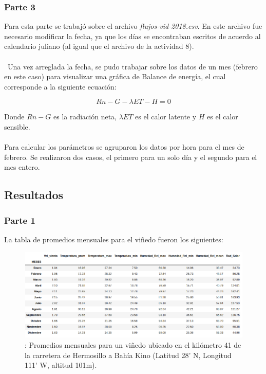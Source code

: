 \documentclass[letterpaper,12pt]{article}
\begin{document}
\subsubsection{Parte 3}
Para esta parte se trabajó sobre el archivo \emph{flujos-vid-2018.csv}. En este archivo fue necesario modificar la fecha, ya que los días se encontraban escritos de acuerdo al calendario juliano (al igual que el archivo de la actividad 8).\\\\\
Una vez arreglada la fecha, se pudo trabajar sobre los datos de un mes (febrero en este caso) para visualizar una gráfica de Balance de energía, el cual corresponde a la siguiente ecuación:

\[Rn - G - \lambda ET - H = 0\]

Donde $Rn-G$ es la radiación neta, $\lambda ET$ es el calor latente y $H$ es el calor sensible.\\\\

Para calcular los parámetros se agruparon los datos por hora para el mes de febrero. Se realizaron dos casos, el primero para un solo día y el segundo para el mes entero.



\subsection{Resultados}

\subsubsection{Parte 1}
La tabla de promedios mensuales para el viñedo fueron los siguientes:

\begin{figure}[H]
\centering
\includegraphics[width=1\textwidth]{tabla_param.png}
\caption{\label{fig:graf1}: Promedios mensuales para un viñedo ubicado en el kilómetro 41 de la carretera de Hermosillo a Bahía Kino (Latitud 28' N, Longitud 111' W, altitud 101m).}
\end{figure}
\end{document}
